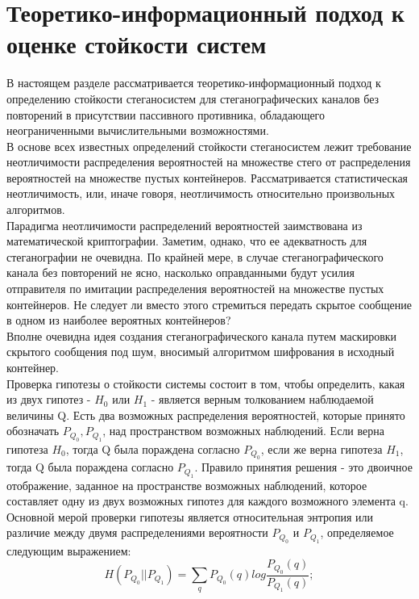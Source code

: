 ﻿\documentclass[a4paper,12pt]{article}
\theoremstyle{plain}
\begin{document}
\newpage

\section{Теоретико-информационный подход к оценке стойкости систем}
\vspace*{1cm}
В настоящем разделе рассматривается теоретико-информационный подход к определению стойкости
стеганосистем для стеганографических каналов без повторений в присутствии пассивного противника,
обладающего неограниченными вычислительными возможностями.\\
В основе всех известных определений стойкости стеганосистем лежит требование неотличимости
распределения вероятностей на множестве стего от распределения вероятностей на множестве пустых
контейнеров. Рассматривается статистическая неотличимость, или, иначе говоря,
неотличимость относительно произвольных алгоритмов. \\
Парадигма неотличимости распределений вероятностей заимствована из математической криптографии. Заметим, однако, что ее адекватность для стеганографии не очевидна. По крайней мере, в
случае стеганографического канала без повторений не ясно, насколько оправданными будут усилия
отправителя по имитации распределения вероятностей на множестве пустых контейнеров. Не следует
ли вместо этого стремиться передать скрытое сообщение в одном из наиболее вероятных контейнеров?\\
Вполне очевидна идея создания стеганографического канала путем
маскировки скрытого сообщения под шум, вносимый алгоритмом шифрования в исходный контейнер. \\
Проверка гипотезы о стойкости системы состоит в том, чтобы определить, какая из двух гипотез - $H_0$ или $H_1$ - является верным толкованием наблюдаемой величины Q. Есть два возможных распределения вероятностей, которые принято обозначать $P_{Q_0}, P_{Q_1}$, над пространством возможных наблюдений. Если верна гипотеза $H_0$, тогда Q была пораждена согласно $P_{Q_0}$, если же верна гипотеза $H_1$, тогда Q  была пораждена согласно $P_{Q_1}$. Правило принятия решения - это двоичное отображение, заданное на пространстве возможных наблюдений, которое составляет одну из двух возможных гипотез для каждого возможного элемента q.
Основной мерой проверки гипотезы является относительная энтропия или различие между двумя распределениями вероятности $P_{Q_0}$ и $P_{Q_1}$, определяемое следующим выражением:
	\begin{equation}
		H(P_{Q_0}||P_{Q_1}) = \sum_{q}P_{Q_0}(q)log\frac{P_{Q_0}(q)}{P_{Q_1}(q)};
	\end{equation}
\end{document}
